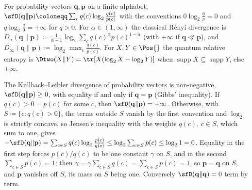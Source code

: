 
\begin{definition}\label{def:kl}
For probability vectors $\mathbf q,\mathbf p$ on a finite alphabet,
$\sfD(\mathbf q\|\mathbf p)\coloneqq\sum_c q(c)\log_2\frac{q(c)}{p(c)}$ with
the conventions $0\log_2\frac{0}{p}=0$ and $q\log_2\frac{q}{0}=+\infty$ for
$q>0$. For $\alpha\in(1,\infty)$ the classical R\'enyi divergence is
$D_{\alpha}(\mathbf q\|\mathbf p)\coloneqq
\frac{1}{\alpha-1}\log_2\sum_{c}q(c)^{\alpha}p(c)^{1-\alpha}$ (with
$+\infty$ if $\mathbf q\not\ll\mathbf p$), and
$D_{\infty}(\mathbf q\|\mathbf p)\coloneqq\log_2\max_c\frac{q(c)}{p(c)}$.
For $X,Y\in\Pos{}$ the quantum relative entropy is
$\Dtwo(X\|Y)=\tr[X(\log_2X-\log_2Y)]$ when
$\operatorname{supp}X\subseteq\operatorname{supp}Y$, else $+\infty$.

The Kullback--Leibler divergence of probability vectors is non-negative,
$\sfD(\mathbf q\|\mathbf p)\ge0$, with equality if and only if
$\mathbf q=\mathbf p$ (Gibbs' inequality). If $q(c)>0=p(c)$ for some $c$,
then $\sfD(\mathbf q\|\mathbf p)=+\infty$. Otherwise, with
$S\coloneqq\{c:q(c)>0\}$, the terms outside $S$ vanish by the first
convention and $\log_2$ is strictly concave, so Jensen's inequality with the
weights $q(c)$, $c\in S$, which sum to one, gives
$-\sfD(\mathbf q\|\mathbf p)=\sum_{c\in S}q(c)\log_2\frac{p(c)}{q(c)}
\le\log_2\sum_{c\in S}p(c)\le\log_21=0$. Equality in the first step
forces $p(c)/q(c)$ to be one constant $\gamma$ on $S$, and in the second
$\sum_{c\in S}p(c)=1$; then $\gamma=\gamma\sum_{c\in S}q(c)
=\sum_{c\in S}p(c)=1$, so $\mathbf p=\mathbf q$ on $S$, and $\mathbf p$
vanishes off $S$, its mass on $S$ being one. Conversely
$\sfD(\mathbf q\|\mathbf q)=0$ term by term.
\end{definition}

